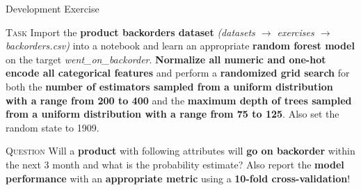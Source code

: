 \documentclass[document.tex]{subfiles}
\begin{document}
    \begin{frame}{Development Exercise }
        \begin{alertblock}{\textsc{Task}}
            Import the \textbf{product backorders dataset} \textit{(datasets $\rightarrow$ exercises $\rightarrow$ backorders.csv)} into a notebook and learn an appropriate \textbf{random forest model} on the target \textit{went\_on\_backorder}. \textbf{Normalize all numeric and one-hot encode all categorical features} and perform a \textbf{randomized grid search} for both the \textbf{number of estimators sampled from a uniform distribution with a range from 200 to 400} and the \textbf{maximum depth of trees sampled from a uniform distribution with a range from 75 to 125}. Also set the random state to 1909.
        \end{alertblock}
        \begin{alertblock}{\textsc{Question}}
            Will a \textbf{product} with following attributes will \textbf{go on backorder} within the next 3 month and what is the probability estimate? Also report the \textbf{model performance} with an \textbf{appropriate metric} using a \textbf{10-fold cross-validation}!
            \begin{table}
                \scalebox{.8}{}

                \scalebox{.8}{}
            \end{table}
        \end{alertblock}
    \end{frame}

    
        
\end{document}
